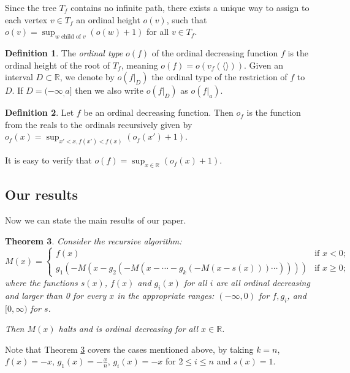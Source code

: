 \documentclass{article}
\newtheorem{Theorem}{Theorem}[section]
\theoremstyle{definition}
\newtheorem{Definition}[Theorem]{Definition}
\begin{document}
Since the tree $T_f$ contains no infinite path, there exists a unique way to assign to each vertex $v\in T_f$ an ordinal height $o(v)$, such that $o(v)=\sup_{\text{$w$ child of $v$}} (o(w)+1)$ for all $v\in T_f$.

\begin{Definition}\label{def_ODF_type}
The \emph{ordinal type} $o(f)$ of the ordinal decreasing function $f$ is the ordinal height of the root of $T_f$, meaning $o(f) = o(v_f(\langle\rangle))$. Given an interval $D\subset \mathbb R$, we denote by $o(f|_D)$ the ordinal type of the restriction of $f$ to $D$. If $D=(-\infty_,a]$ then we also write $o(f|_D)$ as $o(f|_a)$.
\end{Definition}

\begin{Definition}
    Let $f$ be an ordinal decreasing function. Then $o_f$ is the function from the reals to the ordinals recursively given by $o_f(x)= \sup_{x'<x, f(x') < f(x)}(o_f(x')+1)$.
\end{Definition}

It is easy to verify that  $o(f)=\sup_{x\in \mathbb{R}}(o_f(x)+1)$.

\subsection{Our results}
    Now we can state the main results of our paper.
    \begin{Theorem}
    \label{M halts}
    Consider the recursive algorithm:
        \begin{equation}
        M(x) = 
            \begin{cases}
                f(x)& \text{if  $x < 0$;}\\
                g_1(-M(x-g_2(-M(x-\cdots-g_k(-M(x-s(x)))\cdots)))) & \text{if  $x \geq 0$;}
            \end{cases}
        \end{equation}
    where the functions $s(x)$, $f(x)$ and $g_i(x)$ for all $i$ are all ordinal decreasing and larger than 0 for every $x$ in the appropriate ranges: $(-\infty, 0)$ for $f,g_i$, and $[0,\infty)$ for $s$.
    
    Then $M(x)$ halts and is ordinal decreasing for all $x \in \mathbb{R}$. 
    \end{Theorem}
    Note that Theorem \ref{M halts} covers the cases mentioned above, by taking $k=n$, $f(x)=-x$, $g_1(x)=-\frac{x}{n}$, $g_i(x)=-x$ for $2 \leq i \leq n$ and $s(x)=1$.
\end{document}
